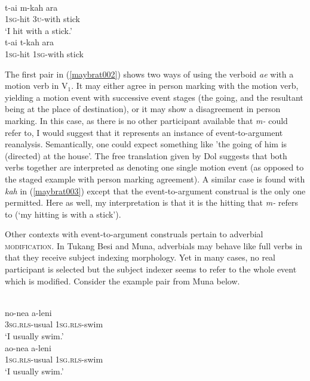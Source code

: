 \ea \label{maybrat003}
\\
\ea
\gll t-ai m-kah ara \\
1\textsc{sg}-hit 3\textsc{u}-with stick \\
\glft `I hit with a stick.' \\ 
\ex
\gll *t-ai t-kah ara \\ 
1\textsc{sg}-hit 1\textsc{sg}-with stick \\
\z
\z

The first pair in (\ref{maybrat002}) shows two ways of using the verboid \textit{ae} with a motion verb in V$_1$. It may either agree in person marking with the motion verb, yielding a motion event with successive event stages (the going, and the resultant being at the place of destination), or it may show a disagreement in person marking. In this case, as there is no other participant available that \textit{m-} could refer to, I would suggest that it represents an instance of event-to-argument reanalysis. Semantically, one could expect something like 'the going of him is (directed) at the house'. The free translation given by Dol suggests that both verbs together are interpreted as denoting one single motion event (as opposed to the staged example with person marking agreement). A similar case is found with \textit{kah} in (\ref{maybrat003}) except that the event-to-argument construal is the only one permitted. Here as well, my interpretation is that it is the hitting that \textit{m-} refers to (`my hitting is with a stick').

Other contexts with event-to-argument construals pertain to adverbial \textsc{modification}. In Tukang Besi and Muna, adverbials may behave like full verbs in that they receive subject indexing morphology. Yet in many cases, no real participant is selected but the subject indexer seems to refer to the whole event which is modified. Consider the example pair from Muna below.

\ea \label{muna003}
\\
\ea
\gll no-nea a-leni \\
3\textsc{sg}.\textsc{rls}-usual 1\textsc{sg}.\textsc{rls}-swim \\
\glft `I usually swim.' \\ 
\ex
\gll ao-nea a-leni \\ 
1\textsc{sg}.\textsc{rls}-usual 1\textsc{sg}.\textsc{rls}-swim \\
\glft `I usually swim.' \\ 
\z
\z

